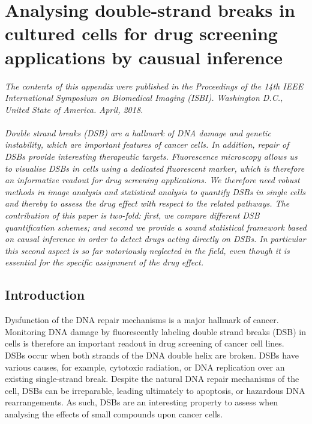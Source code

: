 
\chapter{Analysing double-strand breaks in cultured cells for drug screening applications by causual inference} %
\label{AppendixC} %


\emph{The contents of this appendix were published in the Proceedings of the 14th IEEE International Symposium on Biomedical Imaging (ISBI). Washington D.C., United State of America. April, 2018. \\ \\ Double strand breaks (DSB) are a hallmark of DNA damage and genetic instability, which are important features of cancer cells.  In addition, repair of DSBs provide interesting therapeutic targets. Fluorescence microscopy allows us to visualise DSBs in cells using a dedicated fluorescent marker, which is therefore an informative readout for drug screening applications. We therefore need robust methods in image analysis and statistical analysis to quantify DSBs in single cells and thereby to assess the drug effect with respect to the related pathways. The contribution of this paper is two-fold: first, we compare different DSB quantification schemes; and second we provide a sound statistical framework based on causal inference in order to detect drugs acting directly on DSBs. In particular this second aspect is so far notoriously neglected in the field, even though it is essential for the specific assignment of the drug effect.}

\section{Introduction}

 Dysfunction of the DNA repair mechanisms is a major hallmark of cancer. Monitoring DNA damage by fluorescently labeling double strand breaks (DSB) in cells is therefore an important readout in drug screening of cancer cell lines. DSBs  occur when both strands of the DNA double helix are broken. DSBs have various causes, for example, cytotoxic radiation, or DNA replication over an existing single-strand break. Despite the natural DNA repair mechanisms of the cell, DSBs can be irreparable, leading ultimately to apoptosis, or hazardous DNA rearrangements. As such, DSBs are an interesting property to assess when analysing the effects of small compounds upon cancer cells.

